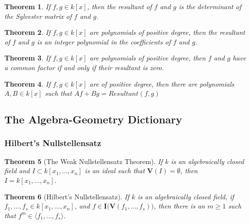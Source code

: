 \documentclass[oneside]{book}
\theoremstyle{mystyle}
\newtheorem{theorem}{Theorem}[section]
\begin{document}
\begin{theorem}
If $f,g \in k[x]$, then the resultant of $f$ and $g$ is the determinant of the Sylvester matrix of $f$ and $g$.
\end{theorem}
\begin{theorem}
If $f,g\in k[x]$ are polynomials of positive degree, then the resultant of $f$ and $g$ is an integer polynomial in the coefficients of $f$ and $g$.
\end{theorem}
\begin{theorem}
If $f,g\in k[x]$ are polynomials of positive degree, then $f$ and $g$ have a common factor if and only if their resultant is zero.
\end{theorem}
\begin{theorem}
If $f,g\in k[x]$ are of positive degree, then there are polynomials $A,B \in k[x]$ such that $Af + Bg = Resultant(f,g)$
\end{theorem}
\subsection{The Algebra-Geometry Dictionary}
\subsubsection{Hilbert's Nullstellensatz}
\begin{theorem}[The Weak Nullstellensatz Theorem]
If $k$ is an algebraically closed field and $I \subset k[x_1,\hdots ,x_n]$ is an ideal such that $\mathbf{V}(I) = \emptyset$, then $I = k[x_1,\hdots ,x_n]$.
\end{theorem}
\begin{theorem}[Hilbert's Nullstellensatz]
If $k$ is an algebraically closed field, if $f_1,\hdots, f_s\in k[x_1,\hdots ,x_n]$, and $f\in \textbf{I}\big(\mathbf{V}(f_1,\hdots, f_s)\big)$, then there is an $m\geq 1$ such that $f^m \in \langle f_1,\hdots, f_s \rangle$.
\end{theorem}
\end{document}

